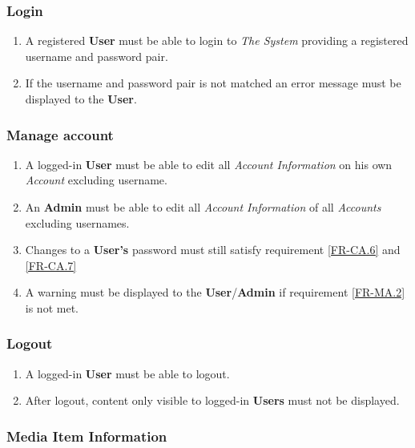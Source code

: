 \subsubsection {Login}
	
\begin{enumerate}[label=\textbf{FR-\twodigits*}, resume]
	\item A registered \textbf{User} must be able to login to \textit{The System} providing a registered username and password pair.
	\item If the username and password pair is not matched an error message must be displayed to the \textbf{User}. 
\end{enumerate}
		
\subsubsection {Manage account}

\begin{enumerate}[label=\textbf{FR-\twodigits*}, resume]
	\item A logged-in \textbf{User} must be able to edit all \textit{Account Information} on his own \textit{Account} excluding username.
	\item An \textbf{Admin} must be able to edit all \textit{Account Information} of all \textit{Accounts} excluding usernames.
	\item Changes to a \textbf{User's} password must still satisfy requirement \ref{FR-CA.6} and \ref{FR-CA.7} \label{FR-MA.2}
	\item A warning must be displayed to the \textbf{User}/\textbf{Admin} if requirement \ref{FR-MA.2} is not met.	
\end{enumerate}
		
\subsubsection {Logout}
\begin{enumerate}[label=\textbf{FR-\twodigits*}, resume]
	\item A logged-in \textbf{User} must be able to logout.
	\item After logout, content only visible to logged-in \textbf{Users} must not be displayed.
\end{enumerate}
	
\subsubsection {Media Item Information} \label{FR-Media}

